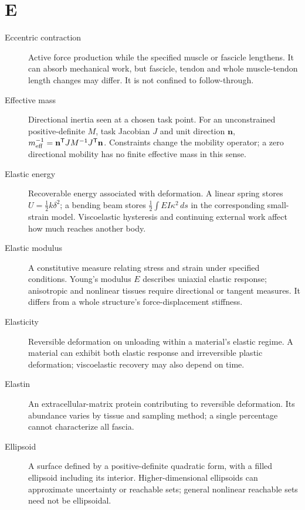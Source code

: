 \section*{E}
\begin{description}

\item[Eccentric contraction] Active force production while the specified muscle or fascicle lengthens. It can absorb mechanical work, but fascicle, tendon and whole muscle-tendon length changes may differ. It is not confined to follow-through.

\item[Effective mass] Directional inertia seen at a chosen task point. For an unconstrained positive-definite $M$, task Jacobian $J$ and unit direction $\mathbf{n}$, $m_{\rm eff}^{-1}=\mathbf{n}^\mathsf{T}JM^{-1}J^\mathsf{T}\mathbf{n}$. Constraints change the mobility operator; a zero directional mobility has no finite effective mass in this sense.

\item[Elastic energy] Recoverable energy associated with deformation. A linear spring stores $U=\tfrac12 k\delta^2$; a bending beam stores $\tfrac12\int EI\kappa^2\,ds$ in the corresponding small-strain model. Viscoelastic hysteresis and continuing external work affect how much reaches another body.

\item[Elastic modulus] A constitutive measure relating stress and strain under specified conditions. Young's modulus $E$ describes uniaxial elastic response; anisotropic and nonlinear tissues require directional or tangent measures. It differs from a whole structure's force-displacement stiffness.

\item[Elasticity] Reversible deformation on unloading within a material's elastic regime. A material can exhibit both elastic response and irreversible plastic deformation; viscoelastic recovery may also depend on time.

\item[Elastin] An extracellular-matrix protein contributing to reversible deformation. Its abundance varies by tissue and sampling method; a single percentage cannot characterize all fascia.

\item[Ellipsoid] A surface defined by a positive-definite quadratic form, with a filled ellipsoid including its interior. Higher-dimensional ellipsoids can approximate uncertainty or reachable sets; general nonlinear reachable sets need not be ellipsoidal.


\end{description}
